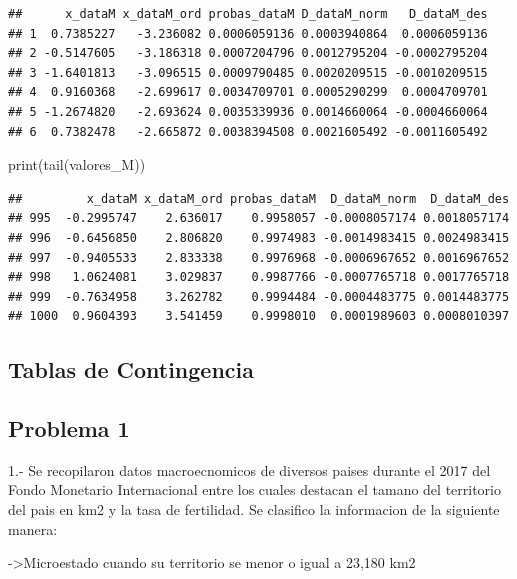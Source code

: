 \documentclass[
]{article}
\newenvironment{Shaded}{\begin{snugshade}}{\end{snugshade}}
\newcommand{\FunctionTok}[1]{\textcolor[rgb]{0.00,0.00,0.00}{#1}}
\newcommand{\NormalTok}[1]{#1}
\begin{document}
\begin{verbatim}
##      x_dataM x_dataM_ord probas_dataM D_dataM_norm   D_dataM_des
## 1  0.7385227   -3.236082 0.0006059136 0.0003940864  0.0006059136
## 2 -0.5147605   -3.186318 0.0007204796 0.0012795204 -0.0002795204
## 3 -1.6401813   -3.096515 0.0009790485 0.0020209515 -0.0010209515
## 4  0.9160368   -2.699617 0.0034709701 0.0005290299  0.0004709701
## 5 -1.2674820   -2.693624 0.0035339936 0.0014660064 -0.0004660064
## 6  0.7382478   -2.665872 0.0038394508 0.0021605492 -0.0011605492
\end{verbatim}

\begin{Shaded}
\begin{Highlighting}[]
\FunctionTok{print}\NormalTok{(}\FunctionTok{tail}\NormalTok{(valores\_M))}
\end{Highlighting}
\end{Shaded}

\begin{verbatim}
##         x_dataM x_dataM_ord probas_dataM  D_dataM_norm  D_dataM_des
## 995  -0.2995747    2.636017    0.9958057 -0.0008057174 0.0018057174
## 996  -0.6456850    2.806820    0.9974983 -0.0014983415 0.0024983415
## 997  -0.9405533    2.833338    0.9976968 -0.0006967652 0.0016967652
## 998   1.0624081    3.029837    0.9987766 -0.0007765718 0.0017765718
## 999  -0.7634958    3.262782    0.9994484 -0.0004483775 0.0014483775
## 1000  0.9604393    3.541459    0.9998010  0.0001989603 0.0008010397
\end{verbatim}

\hypertarget{tablas-de-contingencia}{%
\subsection{Tablas de Contingencia}\label{tablas-de-contingencia}}

\hypertarget{problema-1}{%
\subsection{Problema 1}\label{problema-1}}

1.- Se recopilaron datos macroecnomicos de diversos paises durante el
2017 del Fondo Monetario Internacional entre los cuales destacan el
tamano del territorio del pais en km2 y la tasa de fertilidad. Se
clasifico la informacion de la siguiente manera:

-\textgreater Microestado cuando su territorio se menor o igual a 23,180
km2
\end{document}
